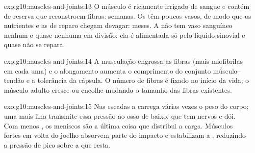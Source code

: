 \begin{solution}{exo:g10:muscles-and-joints:13}
O músculo é ricamente irrigado de sangue e contém  de reserva
que reconstroem fibras: semanas. Os  têm poucos vasos, de
modo que os nutrientes e as  de reparo chegam devagar: meses. A
 não tem vaso sanguíneo nenhum e quase nenhuma  em
divisão; ela é alimentada só pelo líquido sinovial e quase não se
repara.
\end{solution}

\begin{solution}{exo:g10:muscles-and-joints:14}
A musculação engrossa as fibras (mais miofibrilas em cada uma) e o
alongamento aumenta o comprimento do conjunto músculo--tendão e a
tolerância da cápsula. O número de fibras é fixado no início da vida; o
músculo adulto cresce ou encolhe mudando o tamanho das fibras
existentes.
\end{solution}

\begin{solution}{exo:g10:muscles-and-joints:15}
Nas escadas a  carrega várias vezes o peso do corpo; uma
 mais fina transmite essa pressão ao osso de baixo, que tem
nervos e dói. Com menos , os meniscos são a última coisa que
distribui a carga. Músculos fortes em volta do joelho absorvem parte do
impacto e estabilizam a , reduzindo a pressão de pico sobre
a  que resta.
\end{solution}

